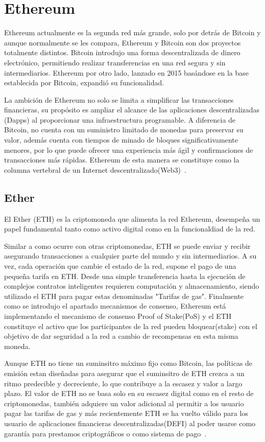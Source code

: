 \section{Ethereum}

Ethereum actualmente es la segunda red más grande, solo por detrás de Bitcoin y aunque normalmente se les compara, Ethereum y Bitcoin son dos proyectos totalmente distintos.
Bitcoin introdujo una forma descentralizada de dinero electrónico, permitiendo realizar transferencias en una red segura y sin intermediarios.
Ethereum por otro lado, lanzado en 2015 basándose en la base establecida por Bitcoin, expandió su funcionalidad.

La ambición de Ethereum no solo se limita a simplificar las transacciones financieras, su propósito es ampliar el alcance de las aplicaciones descentralizadas (Dapps) al proporcionar una infraestructura programable.
A diferencia de Bitcoin, no cuenta con un suministro limitado de monedas para preservar su valor, además cuenta con tiempos de minado de bloques significativamente menores, por lo que puede ofrecer una experiencia más ágil y confirmaciones de transacciones más rápidas.
Ethereum de esta manera se constituye como la columna vertebral de un Internet descentralizado(Web3)~\cite{QueEsEthereum}.

\subsection{Ether}

El Ether (ETH) es la criptomoneda que alimenta la red Ethereum, desempeña un papel fundamental tanto como activo digital como en la funcionaldiad de la red.

Similar a como ocurre con otras criptomonedas, ETH se puede enviar y recibir asegurando transacciones a cualquier parte del mundo y sin intermediarios.
A su vez, cada operación que cambie el estado de la red, supone el pago de una pequeña tarifa en ETH. Desde una simple transferencia hasta la ejecución de complejos contratos inteligentes requieren computación y almacenamiento, siendo utilizado el ETH para pagar estas denominadas "Tarifas de gas".
Finalmente como se introdujo el apartado mecanismos de consenso, Ethereum está implementando el mecanismo de consenso Proof of Stake(PoS) y el ETH constituye el activo que los participantes de la red pueden bloquear(stake) con el objetivo de dar seguridad a la red a cambio de recompensas en esta misma moneda.

Aunque ETH no tiene un suminsitro máximo fijo como Bitcoin, las políticas de emisión estan diseñadas para asegurar que el suminsitro de ETH crezca a un ritmo predecible y decreciente, lo que contribuye a la escasez y valor a largo plazo.
El valor de ETH no se basa solo en su escasez digital como en el resto de criptomonedas, también adquiere un valor adicional al permitir a los usuario pagar las tarifas de gas y más recientemente ETH se ha vuelto válido para los usuario de aplicaciones financieras descentralizadas(DEFI) al poder usarse como garantía para prestamos criptográficos o como sistema de pago~\cite{QueEsETH}.



